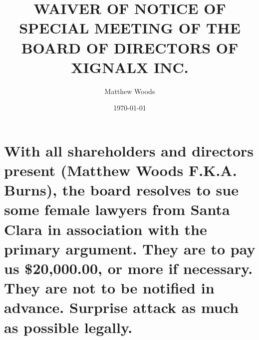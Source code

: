 \documentclass{article}
\title{WAIVER OF NOTICE OF SPECIAL MEETING OF THE BOARD OF DIRECTORS OF XIGNALX INC.}
\author{Matthew Woods}
\date{\today}
\begin{document}
\maketitle

\section{With all shareholders and directors present (Matthew Woods F.K.A. Burns), the board resolves to sue some female lawyers from Santa Clara in association with 
the primary argument. They are to pay us \$20,000.00, or more if necessary. They are not to be notified in advance. Surprise attack as much as possible legally.}
\end{document}
